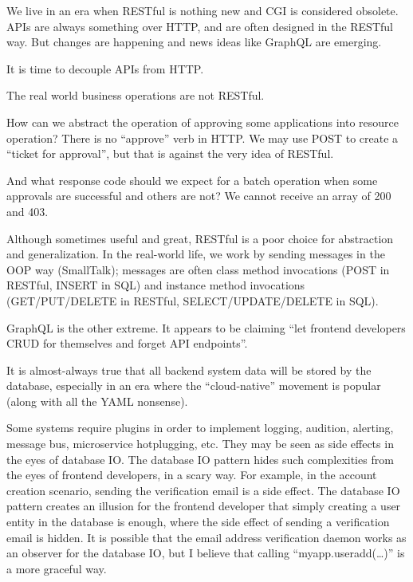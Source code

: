 
\begin{multicols*}{2}
	We live in an era when RESTful is nothing new and CGI is considered obsolete.
	APIs are always something over HTTP, and are often designed in the RESTful way.
	But changes are happening and news ideas like GraphQL are emerging.

    It is time to decouple APIs from HTTP.

	The real world business operations are not RESTful.

	How can we abstract the operation of approving some applications into resource operation?
	There is no ``approve'' verb in HTTP.
	We may use POST to create a ``ticket for approval'',
	but that is against the very idea of RESTful.

	And what response code should we expect for a batch operation when some approvals are successful and others are not?
	We cannot receive an array of 200 and 403.

	Although sometimes useful and great, RESTful is a poor choice for abstraction and generalization.
	In the real-world life, we work by sending messages in the OOP way (SmallTalk);
	messages are often class method invocations (POST in RESTful, INSERT in SQL)
	and instance method invocations (GET/PUT/DELETE in RESTful, SELECT/UPDATE/DELETE in SQL).

	GraphQL is the other extreme.
	It appears to be claiming ``let frontend developers CRUD for themselves and forget API endpoints''.

	It is almost-always true that all backend system data will be stored by the database,
	especially in an era where the ``cloud-native'' movement is popular (along with all the YAML nonsense).

	Some systems require plugins in order to implement
	logging, audition, alerting, message bus, microservice hotplugging, etc.
	They may be seen as side effects in the eyes of database IO.
	The database IO pattern hides such complexities from the eyes of frontend developers, in a scary way.
	For example, in the account creation scenario, sending the verification email is a side effect.
	The database IO pattern creates an illusion for the frontend developer that
	simply creating a user entity in the database is enough,
	where the side effect of sending a verification email is hidden.
	It is possible that the email address verification daemon works as an observer for the database IO,
	but I believe that calling ``myapp.useradd(\ldots)'' is a more graceful way.


\end{multicols*}
